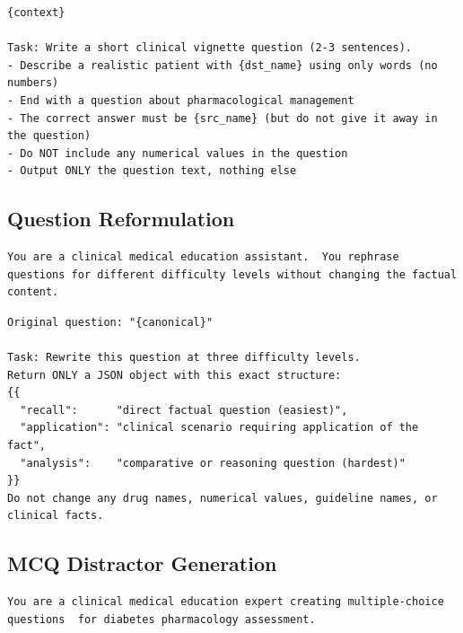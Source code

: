 \begin{lstlisting}[language={},
  basicstyle=\small\ttfamily,
  breaklines=true,
  frame=single,
  caption={User prompt template: Clinical Vignette.}]
{context}

Task: Write a short clinical vignette question (2-3 sentences).
- Describe a realistic patient with {dst_name} using only words (no numbers)
- End with a question about pharmacological management
- The correct answer must be {src_name} (but do not give it away in the question)
- Do NOT include any numerical values in the question
- Output ONLY the question text, nothing else
\end{lstlisting}

\subsection*{Question Reformulation}

\begin{lstlisting}[language={},
  basicstyle=\small\ttfamily,
  breaklines=true,
  frame=single,
  caption={System prompt: Question Reformulation.}]
You are a clinical medical education assistant.  You rephrase questions for different difficulty levels without changing the factual content.
\end{lstlisting}

\begin{lstlisting}[language={},
  basicstyle=\small\ttfamily,
  breaklines=true,
  frame=single,
  caption={User prompt template: Question Reformulation.}]
Original question: "{canonical}"

Task: Rewrite this question at three difficulty levels.
Return ONLY a JSON object with this exact structure:
{{
  "recall":      "direct factual question (easiest)",
  "application": "clinical scenario requiring application of the fact",
  "analysis":    "comparative or reasoning question (hardest)"
}}
Do not change any drug names, numerical values, guideline names, or clinical facts.
\end{lstlisting}

\subsection*{MCQ Distractor Generation}

\begin{lstlisting}[language={},
  basicstyle=\small\ttfamily,
  breaklines=true,
  frame=single,
  caption={System prompt: MCQ Distractor Generation.}]
You are a clinical medical education expert creating multiple-choice questions  for diabetes pharmacology assessment.
\end{lstlisting}

